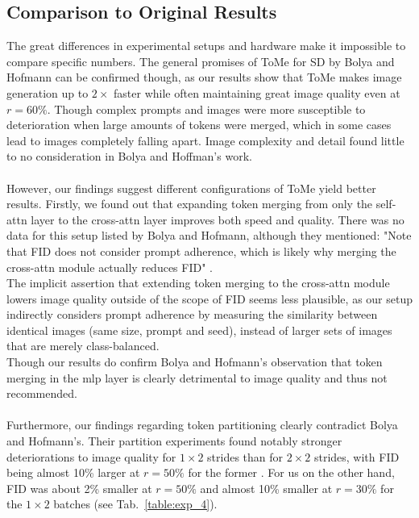 \subsection{Comparison to Original Results}
The great differences in experimental setups and hardware make it impossible to compare specific numbers. The general promises of ToMe for SD by Bolya and Hofmann can be confirmed though, as our results show that ToMe makes image generation up to $2 \times$ faster while often maintaining great image quality even at \(r = 60\%\). Though complex prompts and images were more susceptible to deterioration when large amounts of tokens were merged, which in some cases lead to images completely falling apart. Image complexity and detail found little to no consideration in Bolya and Hoffman's work.\\
\\
However, our findings suggest different configurations of ToMe yield better results.
Firstly, we found out that expanding token merging from only the self-attn layer to the cross-attn layer improves both speed and quality. There was no data for this setup listed by Bolya and Hofmann, although they mentioned: "Note that FID does not consider prompt adherence, which is likely why merging the cross-attn module actually reduces FID" \cite{bolya2023tomesd}. \\
The implicit assertion that extending token merging to the cross-attn module lowers image quality outside of the scope of FID seems less plausible, as our setup indirectly considers prompt adherence by measuring the similarity between identical images (same size, prompt and seed), instead of larger sets of images that are merely class-balanced.\\
Though our results do confirm Bolya and Hofmann's observation that token merging in the mlp layer is clearly detrimental to image quality and thus not recommended.\\
\\
Furthermore, our findings regarding token partitioning clearly contradict Bolya and Hofmann's. Their partition experiments found notably stronger deteriorations to image quality for $1 \times 2$ strides than for $2 \times 2$ strides, with FID being almost 10\% larger at \(r=50\%\) for the former \cite[Tab.~2 (a)]{bolya2023tomesd}. For us on the other hand, FID was about 2\% smaller at \(r=50\%\) and almost 10\% smaller at \(r=30\%\) for the $1 \times 2$ batches (see Tab.~\ref{table:exp_4}). 

